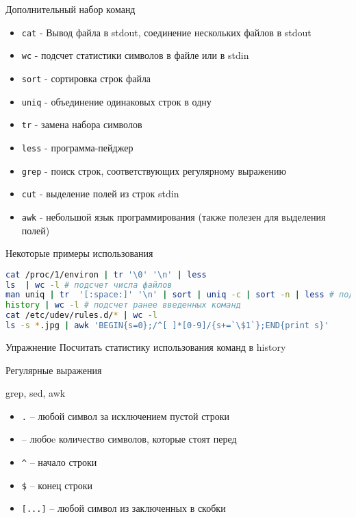 \begin{frame}{Дополнительный набор команд}
  \begin{itemize}
    \item {\tt cat} - Вывод файла в stdout, соединение нескольких файлов в stdout
    \item {\tt wc} - подсчет статистики символов в файле или в stdin 
    \item {\tt sort} - сортировка строк файла
    \item {\tt uniq} - объединение одинаковых строк в одну
    \item {\tt tr} - замена набора символов
    \item {\tt less} - программа-пейджер
    \item {\tt grep} - поиск строк, соответствующих регулярному выражению
    \item {\tt cut} - выделение полей из строк stdin
    \item {\tt awk} - небольшой язык программирования (также полезен для выделения полей)
  \end{itemize}
\end{frame}


\begin{frame}[fragile]{Некоторые примеры использования}
\begin{lstlisting}[language=bash]
cat /proc/1/environ | tr '\0' '\n' | less
ls  | wc -l # подсчет числа файлов
man uniq | tr  '[:space:]' '\n' | sort | uniq -c | sort -n | less # подсчет количества слов в тексте man uniq
history | wc -l # подсчет ранее введенных команд
cat /etc/udev/rules.d/* | wc -l
ls -s *.jpg | awk 'BEGIN{s=0};/^[ ]*[0-9]/{s+=`\$1`};END{print s}' 
\end{lstlisting}
  \pause
  \begin{block}{Упражнение}
    Посчитать статистику использования команд в history
  \end{block}
\end{frame}

\begin{frame}[fragile]{Регулярные выражения}
	\begin{block}{grep, sed, awk}
	\end{block}
	\begin{itemize}
		\item {\tt .} -- любой символ за исключением пустой строки
		\item {\tt *} -- любоe количество символов, которые стоят перед {\tt *}
		\item {\tt \^{}} -- начало строки
		\item {\tt \$} -- конец строки
		\item {\tt [...]} -- любой символ из заключенных в скобки
	\end{itemize}
\end{frame}

